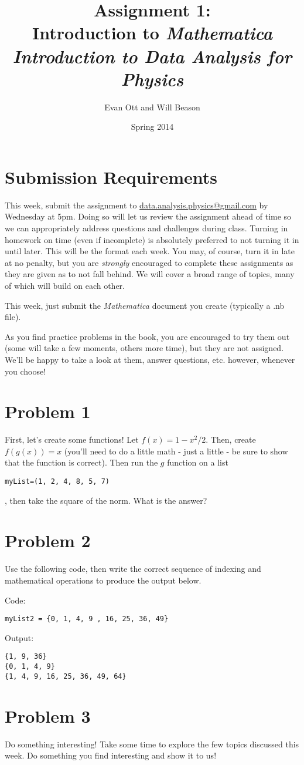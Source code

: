 \documentclass{article}
\title{Assignment 1: \\ Introduction to \emph{Mathematica}\\
\large \emph{Introduction to Data Analysis for Physics}}
\author{Evan Ott and Will Beason}
\date{Spring 2014}
\begin{document}
\maketitle
\section{Submission Requirements}
This week, submit the assignment to \href{mailto:data.analysis.physics@gmail.com}{data.analysis.physics@gmail.com} by Wednesday at 5pm. Doing so will let
us review the assignment ahead of time so we can appropriately address questions and challenges during class. Turning in homework on time (even if incomplete) is absolutely
preferred to not turning it in until later. This will be the format each week. You may, of course,
turn it in late at no penalty, but you are \emph{strongly} encouraged to complete these assignments as they are given as to not fall behind. We will cover a broad
range of topics, many of which will build on each other.

This week, just submit the \emph{Mathematica} document you create (typically a .nb file).

As you find practice problems in the book, you are encouraged to try them out (some will take a few moments, others more time), but they are not assigned. We'll
be happy to take a look at them, answer questions, etc. however, whenever you choose!
\section{Problem 1}
First, let's create some functions! Let $f(x)=1-x^2/2$. Then, create $f(g(x))=x$ (you'll need to do a little math - just a little - be sure to show that the function is correct).
Then run the $g$ function on a list \begin{verbatim}myList=(1, 2, 4, 8, 5, 7)\end{verbatim}, then take the square of the norm. What is the answer?
\section{Problem 2}
Use the following code, then write the correct sequence of indexing and mathematical operations to produce the output below.

Code:
\begin{verbatim}
myList2 = {0, 1, 4, 9 , 16, 25, 36, 49}
\end{verbatim}

Output:
\begin{verbatim}
{1, 9, 36}
{0, 1, 4, 9}
{1, 4, 9, 16, 25, 36, 49, 64}
\end{verbatim}
\section{Problem 3}
Do something interesting! Take some time to explore the few topics discussed this week. Do something you find interesting and show it to us!
\end{document}
